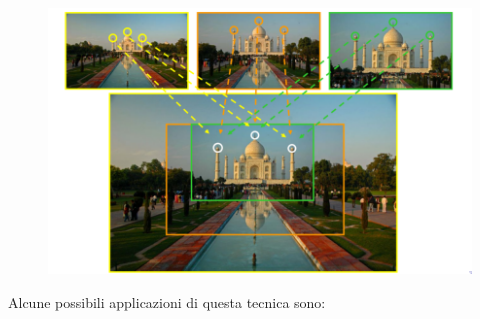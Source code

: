 \begin{figure}[H]
    \centering
    \includegraphics[width=\linewidth, keepaspectratio]{capitoli/immagini/imgs/image-registration.png}
\end{figure}

Alcune possibili applicazioni di questa tecnica sono:

